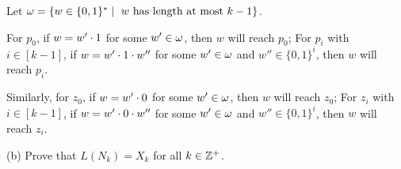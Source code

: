 \documentclass[11pt, sakura, night, 1in]{hw}
\begin{document}
Let $\omega=\{w\in\{0,1\}^*\mid \text{ $w$ has length at most $k-1$}\}$.

For $p_0$, if $w=w'\cdot 1$ for some $w'\in\omega$, then $w$ will reach $p_0$; For $p_i$ with $i\in[k-1]$, if $w=w'\cdot 1\cdot w''$ for some $w'\in\omega$ and $w''\in\{0,1\}^{i}$, then $w$ will reach $p_i$.

Similarly, for $z_0$, if $w=w'\cdot 0$ for some $w'\in\omega$, then $w$ will reach $z_0$; For $z_i$ with $i\in[k-1]$, if $w=w'\cdot 0\cdot w''$ for some $w'\in\omega$ and $w''\in\{0,1\}^{i}$, then $w$ will reach $z_i$.



(b) Prove that $L(N_k) = X_k$ for all $k \in \mathbb{Z}^+$.


\end{document}
